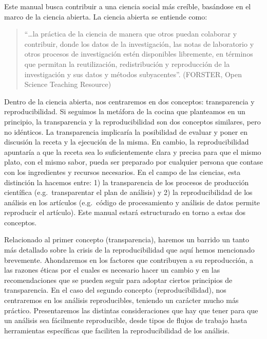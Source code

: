 \documentclass[
]{book}
\begin{document}
Este manual busca contribuir a una ciencia social más creíble, basándose en el marco de la ciencia abierta. La ciencia abierta se entiende como:

\begin{quote}
``\ldots la práctica de la ciencia de manera que otros puedan colaborar y contribuir, donde los datos de la investigación, las notas de laboratorio y otros procesos de investigación estén disponibles libremente, en términos que permitan la reutilización, redistribución y reproducción de la investigación y sus datos y métodos subyacentes''. (FORSTER, Open Science Teaching Resource)
\end{quote}

Dentro de la ciencia abierta, nos centraremos en dos conceptos: transparencia y reproducibilidad. Si seguimos la metáfora de la cocina que planteamos en un principio, la transparencia y la reproducibilidad son dos conceptos similares, pero no idénticos. La transparencia implicaría la posibilidad de evaluar y poner en discusión la receta y la ejecución de la misma. En cambio, la reproducibilidad apuntaría a que la receta sea lo suficientemente clara y precisa para que el mismo plato, con el mismo sabor, pueda ser preparado por cualquier persona que contase con los ingredientes y recursos necesarios. En el campo de las ciencias, esta distinción la hacemos entre: 1) la transparencia de los procesos de producción científica (e.g.~transparentar el plan de análisis) y 2) la reproducibilidad de los análisis en los artículos (e.g.~código de procesamiento y análisis de datos permite reproducir el artículo). Este manual estará estructurado en torno a estas dos conceptos.

Relacionado al primer concepto (transparencia), haremos un barrido un tanto más detallado sobre la crisis de la reproducibilidad que aquí hemos mencionado brevemente. Ahondaremos en los factores que contribuyen a su reproducción, a las razones éticas por el cuales es necesario hacer un cambio y en las recomendaciones que se pueden seguir para adoptar ciertos principios de transparencia. En el caso del segundo concepto (reproducibilidad), nos centraremos en los análisis reproducibles, teniendo un carácter mucho más práctico. Presentaremos las distintas consideraciones que hay que tener para que un análisis sea fácilmente reproducible, desde tipos de flujos de trabajo hasta herramientas específicas que faciliten la reproducibilidad de los análisis.
\end{document}
